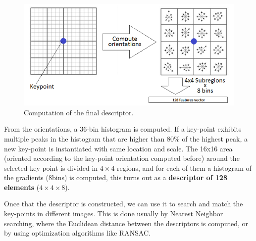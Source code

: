 \begin{figure}[H]
    \centering
    \includegraphics[scale=0.3]{Figures/decrs.png}
    \caption{Computation of the final descriptor.}
    \label{fig:decrs}
\end{figure}

From the orientations, a 36-bin histogram is computed. If a key-point exhibits multiple peaks in the histogram that are higher than $80\%$ of the highest peak, a new key-point is instantiated with same location and scale.
The 16x16 area (oriented according to the key-point orientation computed before) around the selected key-point is divided in $4\times4$ regions, and for each of them a histogram of the gradients (8bins) is computed, this turns out as a \textbf{descriptor of 128 elements} ($4\times4\times8$).

Once that the descriptor is constructed, we can use it to search and match the key-points in different images. This is done usually by Nearest Neighbor searching, where the Euclidean distance between the descriptors is computed, or by using optimization algorithms like RANSAC. 